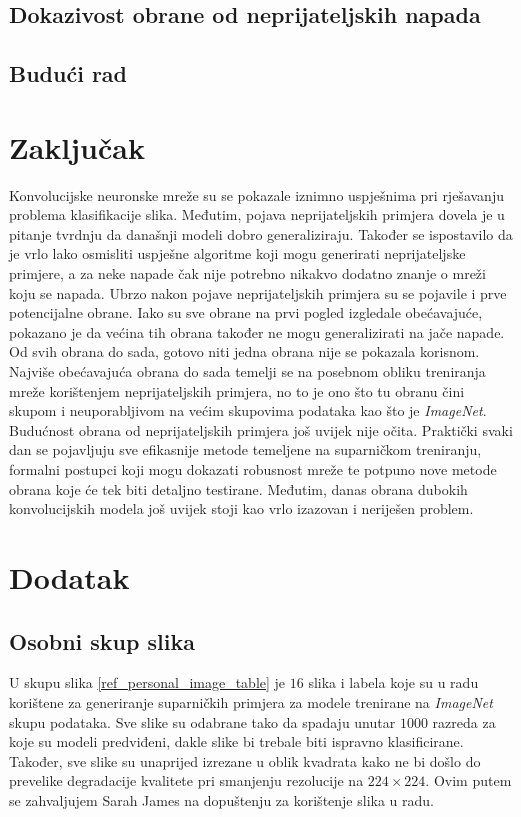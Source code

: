 \documentclass[utf8, diplomski]{fer}
\begin{document}
\section{Dokazivost obrane od neprijateljskih napada}
\section{Budući rad}

\chapter{Zaključak}
Konvolucijske neuronske mreže su se pokazale iznimno uspješnima pri rješavanju problema klasifikacije slika. Međutim, pojava neprijateljskih primjera dovela je u pitanje tvrdnju da današnji modeli dobro generaliziraju. Također se ispostavilo da je vrlo lako osmisliti uspješne algoritme koji mogu generirati neprijateljske primjere, a za neke napade čak nije potrebno nikakvo dodatno znanje o mreži koju se napada. Ubrzo nakon pojave neprijateljskih primjera su se pojavile i prve potencijalne obrane. Iako su sve obrane na prvi pogled izgledale obećavajuće, pokazano je da većina tih obrana također ne mogu generalizirati na jače napade. Od svih obrana do sada, gotovo niti jedna obrana nije se pokazala korisnom. Najviše obećavajuća obrana do sada temelji se na posebnom obliku treniranja mreže korištenjem neprijateljskih primjera, no to je ono što tu obranu čini skupom i neuporabljivom na većim skupovima podataka kao što je \textit{ImageNet}. Budućnost obrana od neprijateljskih primjera još uvijek nije očita. Praktički svaki dan se pojavljuju sve efikasnije metode temeljene na suparničkom treniranju, formalni postupci koji mogu dokazati robusnost mreže te potpuno nove metode obrana koje će tek biti detaljno testirane. Međutim, danas obrana dubokih konvolucijskih modela još uvijek stoji kao vrlo izazovan i neriješen problem.





\chapter{Dodatak}\label{dodatak}
\section{Osobni skup slika}\label{osobni_skup}
U skupu slika \ref{ref_personal_image_table} je $16$ slika i labela koje su u radu korištene za generiranje suparničkih primjera za modele trenirane na \textit{ImageNet} skupu podataka. Sve slike su odabrane tako da spadaju unutar $1000$ razreda za koje su modeli predviđeni, dakle slike bi trebale biti ispravno klasificirane. Također, sve slike su unaprijed izrezane u oblik kvadrata kako ne bi došlo do prevelike degradacije kvalitete pri smanjenju rezolucije na $224\times224$. Ovim putem se zahvaljujem Sarah James na dopuštenju za korištenje slika u radu.
\end{document}
